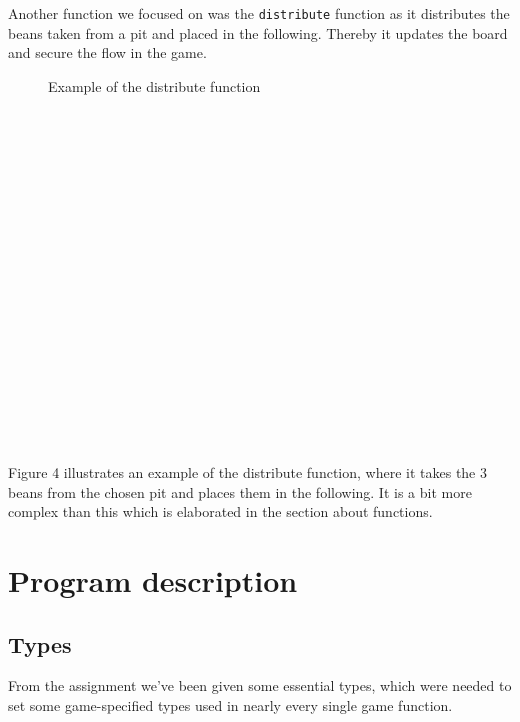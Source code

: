 \documentclass[a4paper]{report}
\begin{document}
Another function we focused on was the \texttt{distribute}
function as it distributes the beans taken from a pit and placed in the following. Thereby it updates the board and secure the flow in the game.
\begin{figure}
\centering
{}
\caption{Example of the distribute function}
\end{figure}
\\\\
\\\\
\\\\
\\\\
\\\\
\\\\
\\\\
\\\\
\\\\
Figure 4 illustrates an example of the distribute function, where it takes the 3 beans from the chosen pit and places them in the following. It is a bit more complex than this which is elaborated in the section about functions.

\section*{Program description}
\subsection*{Types}
From the assignment we've been given some essential types, which were needed to set some game-specified types used in nearly every single game function.
\end{document}
